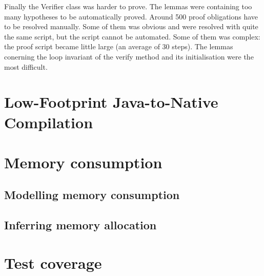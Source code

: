 Finally the Verifier class was harder to prove.
The lemmas were containing too many hypotheses to be automatically proved.
Around 500 proof obligations have to be resolved manually.
Some of them was obvious and were resolved with quite the same script, but the script cannot be automated.
Some of them was complex: the proof script became little large (an average of 30 steps).
The lemmas conerning the loop invariant of the verify method and its initialisation were the most difficult.
\section{Low-Footprint Java-to-Native Compilation}

\section{Memory consumption}

%
\subsection{Modelling memory consumption}\label{sec:verif}

\subsection{Inferring memory allocation}\label{sec:infer}

%
\section{Test coverage}
